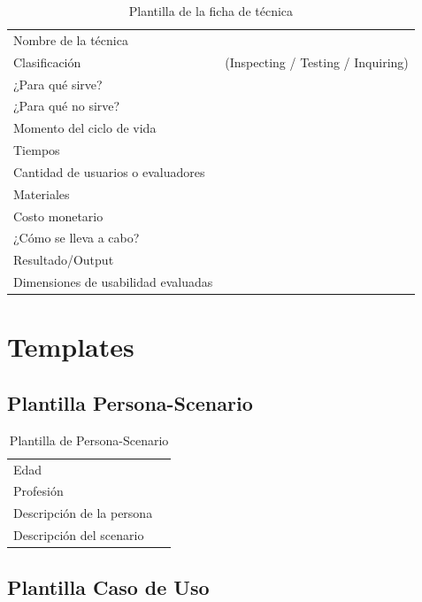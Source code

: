 \documentclass[12pt, a4paper]{report}
\begin{document}
\begin{table}[H]
\centering
\begin{tabularx}{\linewidth}{lX}
\toprule
Nombre de la técnica & \\
Clasificación & (Inspecting / Testing / Inquiring) \\
¿Para qué sirve? & \\
¿Para qué no sirve? & \\
Momento del ciclo de vida & \\
Tiempos & \\
Cantidad de usuarios o evaluadores & \\
Materiales & \\
Costo monetario & \\
¿Cómo se lleva a cabo? & \\
Resultado/Output & \\
Dimensiones de usabilidad evaluadas & \\
\bottomrule
\end{tabularx}
\caption{Plantilla de la ficha de técnica}
\end{table}

\chapter{Templates}
\label{anx:templates}

\section{Plantilla Persona-Scenario}

\begin{table}[H]
\centering
\begin{tabularx}{\linewidth}{lX}
\toprule
Edad & \\
Profesión & \\
Descripción de la persona & \\
Descripción del scenario & \\
\bottomrule
\end{tabularx}
\caption{Plantilla de Persona-Scenario}
\end{table}

\section{Plantilla Caso de Uso}
\end{document}
